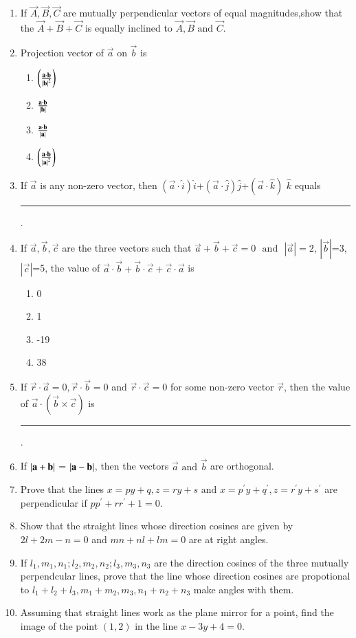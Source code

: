 \begin{enumerate}[label=\thesubsection.\arabic*,ref=\thesubsection.\theenumi]
    \item If $ \vec{A},\vec{B},\vec{C} $ are mutually perpendicular vectors of equal magnitudes,show that the  $ \vec{A}+\vec{B}+\vec{C} $ is equally inclined to $ \vec{A},\vec{B}  \text{ and }  \vec{C} $.
\item Projection vector of $\vec{a}$ on $\vec{b}$ is
	\begin{enumerate}
\item $\left(\frac{\mathbf{a}\cdot\mathbf{b}}{\left\vert\mathbf{b}\right\vert^2}\right)$
\item $\frac{\mathbf{a}\cdot\mathbf{b}}{\left\vert\mathbf{b}\right\vert}$
\item $\frac{\mathbf{a}\cdot\mathbf{b}}{\left\vert\mathbf{a}\right\vert}$
\item $\left(\frac{\mathbf{a}\cdot\mathbf{b}}{\left\vert\mathbf{a}\right\vert^2}\right)$
\end{enumerate}
\item If $\vec{a}$ is  any non-zero vector, then $(\vec{a}\cdot \hat{i})\hat{i}$+$(\vec{a}\cdot \hat{j})\hat{j}$+$(\vec{a}\cdot \hat{k})$ $\hat{k}$ equals \rule{1cm}{0.15mm}.
\item If $\vec{a},\vec{b},\vec{c}$ are the three vectors such that $\vec{a}+\vec{b}+\vec{c}=0$ $\text{ and }$ $|\vec{a}|=2$, $|\vec{b}|$=3, $|\vec{c}|$=5, the value of $\vec{a} \cdot \vec{b}+\vec{b} \cdot \vec{c}+\vec{c} \cdot \vec{a}$ is
	\begin{enumerate}
\item 0
\item 1	
\item -19
\item 38
\end{enumerate}
\item If $\vec{r}\cdot\vec{a}=0, \vec{r}\cdot\vec{b}=0$ and $\vec{r}\cdot\vec{c}=0$ for some non-zero vector $\vec{r}$, then the value of $\vec{a}\cdot(\vec{b}\times\vec{c})$ is \rule{1cm}{0.15mm}.
\item If $\left\vert\mathbf{a}+\mathbf{b}\right\vert$ = $\left\vert\mathbf{a}-\mathbf{b}\right\vert$, then the vectors $\vec{a}$ $\text {and}$ $\vec{b}$ are orthogonal.
\item Prove that the lines $x=py+q , z=ry+s \text{ and } x=p^{\prime}y+q^{\prime}, z=r^{\prime}y+s^{\prime} $ are perpendicular if $pp^{\prime}+rr^{\prime}+1=0$.
\item Show that the straight lines whose direction cosines are given by $2l+2m-n=0$ and $mn+nl+lm=0$ are at right angles.
\item If $l_1, m_1, n_1;l_2, m_2, n_2;l_3, m_3, n_3$ are the direction cosines of the three mutually perpendcular lines, prove that the line whose direction cosines are propotional to $l_1+l_2+l_3 , m_1+m_2,m_3, n_1+n_2+n_3$ make angles with them.
\item Assuming that straight lines work as the plane mirror for a point, find the image of the point $(1,2)$ in the line $x-3y+4=0$.
\end{enumerate}
